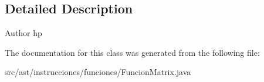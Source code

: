 \subsection{Detailed Description}
\begin{DoxyAuthor}{Author}
hp 
\end{DoxyAuthor}


The documentation for this class was generated from the following file\+:\begin{DoxyCompactItemize}
\item 
src/ast/instrucciones/funciones/Funcion\+Matrix.\+java\end{DoxyCompactItemize}
